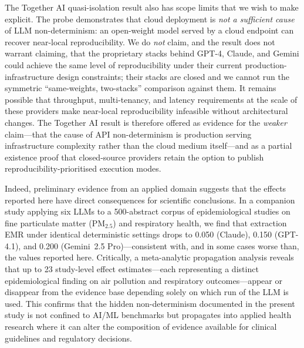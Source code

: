 \documentclass[sn-nature]{sn-jnl}
\begin{document}
The Together AI quasi-isolation result also has scope limits that we wish to make explicit.
The probe demonstrates that cloud deployment is \emph{not a sufficient cause} of LLM non-determinism: an open-weight model served by a cloud endpoint can recover near-local reproducibility.
We do \emph{not} claim, and the result does not warrant claiming, that the proprietary stacks behind GPT-4, Claude, and Gemini could achieve the same level of reproducibility under their current production-infrastructure design constraints; their stacks are closed and we cannot run the symmetric ``same-weights, two-stacks'' comparison against them.
It remains possible that throughput, multi-tenancy, and latency requirements at the scale of these providers make near-local reproducibility infeasible without architectural changes.
The Together AI result is therefore offered as evidence for the \emph{weaker} claim---that the cause of API non-determinism is production serving infrastructure complexity rather than the cloud medium itself---and as a partial existence proof that closed-source providers retain the option to publish reproducibility-prioritised execution modes.

Indeed, preliminary evidence from an applied domain suggests that the effects reported here have direct consequences for scientific conclusions.
In a companion study applying six LLMs to a 500-abstract corpus of epidemiological studies on fine particulate matter (PM$_{2.5}$) and respiratory health\cite{rover2026evidence}, we find that extraction EMR under identical deterministic settings drops to 0.050 (Claude), 0.150 (GPT-4.1), and 0.200 (Gemini~2.5 Pro)---consistent with, and in some cases worse than, the values reported here.
Critically, a meta-analytic propagation analysis reveals that up to 23 study-level effect estimates---each representing a distinct epidemiological finding on air pollution and respiratory outcomes---appear or disappear from the evidence base depending solely on which run of the LLM is used.
This confirms that the hidden non-determinism documented in the present study is not confined to AI/ML benchmarks but propagates into applied health research where it can alter the composition of evidence available for clinical guidelines and regulatory decisions.
\end{document}
